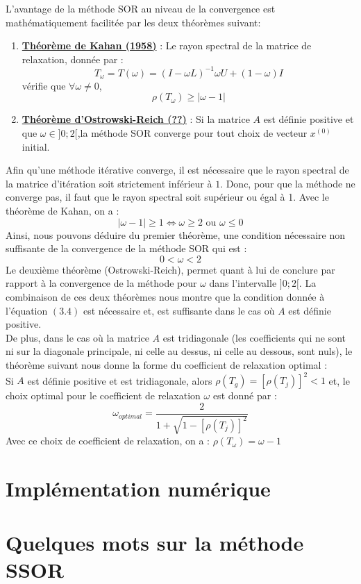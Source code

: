 L'avantage de la méthode SOR au niveau de la convergence est mathématiquement facilitée par les deux théorèmes suivant:
\begin{enumerate}
	\item \textbf{\underline{Théorème de Kahan (1958)}} : Le rayon spectral de la matrice de relaxation, donnée par :
	$$
	T_\omega=T(\omega)=(I-\omega L)^{-1}{\omega U +(1-\omega)I}
	$$
	vérifie que $\forall \omega \neq 0$,
	$$
	\rho(T_\omega)\geq|\omega -1|
	$$
	\item \textbf{\underline{Théorème d'Ostrowski-Reich (??)}} : Si la matrice $A$ est définie positive et que $\omega \in ]0;2[$,la méthode SOR converge pour tout choix de vecteur $x^{(0)}$ initial.
\end{enumerate}
Afin qu'une méthode itérative converge, il est nécessaire que le rayon spectral de la matrice d'itération soit strictement inférieur à $1$. Donc, pour que la méthode ne converge pas, il faut que le rayon spectral soit supérieur ou égal à 1. Avec le théorème de Kahan, on a :
$$
|\omega -1|\geq 1 \Leftrightarrow \omega \geq 2 \text{ ou } \omega \leq 0 
$$
Ainsi, nous pouvons déduire du premier théorème, une condition nécessaire non suffisante de la convergence de la méthode SOR qui est :
\begin{equation}
	0<\omega<2
\end{equation}
Le deuxième théorème (Ostrowski-Reich), permet quant à lui de conclure par rapport à la convergence de la méthode pour $\omega$ dans l'intervalle $]0;2[$. La combinaison de ces deux théorèmes nous montre que la condition donnée à l'équation $(3.4)$ est nécessaire et, est suffisante dans le cas où $A$ est définie positive.\\

De plus, dans le cas où la matrice $A$ est tridiagonale (les coefficients qui ne sont ni sur la diagonale principale, ni celle au dessus, ni celle au dessous, sont nuls), le théorème suivant nous donne la forme du coefficient de relaxation optimal :\\

Si $A$ est définie positive et est tridiagonale, alors $\rho(T_g)=[\rho(T_j)]^2<1$ et, le choix optimal pour le coefficient de relaxation $\omega$ est donné par : 
$$
\omega_{optimal}=\frac{2}{1+\sqrt{1-[\rho(T_j)]^2}}
$$
Avec ce choix de coefficient de relaxation, on a : $\rho(T_\omega)=\omega-1$
\section{Implémentation numérique}
\section{Quelques mots sur la méthode SSOR}